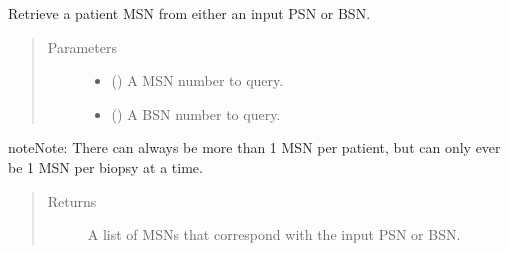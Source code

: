 \documentclass[letterpaper,10pt,english]{sphinxmanual}
\begin{document}
\begin{fulllineitems}
\begin{fulllineitems}
%
\begin{sphinxVerbatim}[commandchars=\\\{\}]
\end{sphinxVerbatim}

\end{fulllineitems}


\begin{fulllineitems}
\label{\detokenize{matchbox_api_utils:matchbox_api_utils.match_data.MatchData.get_msn}}
Retrieve a patient MSN from either an input PSN or BSN.
\begin{quote}\begin{description}
\item[{Parameters}] \leavevmode\begin{itemize}
\item {} 
 () \textendash{} A MSN number to query.

\item {} 
 () \textendash{} A BSN number to query.

\end{itemize}

\end{description}\end{quote}

\begin{sphinxadmonition}{note}{Note:}
There can always be more than 1 MSN per patient, but can only
ever be 1 MSN per biopsy at a time.
\end{sphinxadmonition}
\begin{quote}\begin{description}
\item[{Returns}] \leavevmode
A list of MSNs that correspond with the input PSN or BSN.


\end{description}
\end{quote}
\end{fulllineitems}
\end{fulllineitems}
\end{document}
